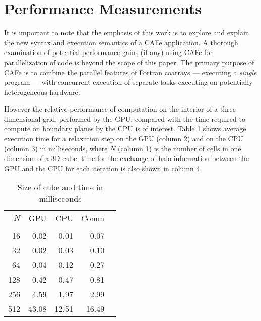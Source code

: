 \section{Performance Measurements}

It is important to note that the emphasis of this work is to explore and explain the new
syntax and execution semantics of a CAFe application.  A thorough examination of potential
performance gains (if any) using CAFe for parallelization of code is beyond the scope of
this paper.  The primary purpose of CAFe is to combine the parallel features of Fortran coarrays
--- executing a \emph{single} program --- with concurrent execution of separate tasks executing on
potentially heterogeneous hardware.

\begin{comment}
However, the relative performance of computation on a cluster of GPUs compared with the
necessary communication of halo information is of interest, especially considering that a
complete exchance of halo data involves communication between multiple coarray images
\emph{and} between each individual host image and its subimage (an attached OpenCL
device).
\end{comment}

However the relative performance of computation on the interior of a three-dimensional
grid, performed by the GPU, compared with the time required to compute on boundary planes by the
CPU is of interest.  Table 1 shows average execution time for a relaxation step on the GPU
(column 2) and on the CPU (column 3) in milliseconds, where $N$ (column 1) is the number of
cells in one dimension of a 3D cube; time for the exchange of halo information
between the GPU and the CPU for each iteration is also shown in column 4.

\begin{table}[]
\centering
\caption{Size of cube and time in milliseconds}
\label{table1}
\begin{tabular}{rrrrr}
$N$   &   GPU	 &  CPU         &   Comm    \\
      &   	 &              &           \\
16    &  0.02    &   0.01	&   0.07    \\
32    &  0.02    &   0.03       &   0.10    \\
64    &  0.04    &   0.12       &   0.27    \\
128   &  0.42    &   0.47	&   0.81    \\
256   &  4.59    &   1.97	&   2.99    \\
512   & 43.08    &   12.51	&  16.49    \\
\end{tabular}
\end{table}

